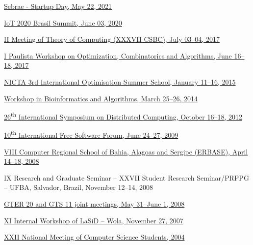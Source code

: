 \documentclass[10pt]{article}
\begin{document}
\begin{innerlist}
\item \href{https://sebrae.com.br/startupday}{Sebrae - Startup Day, May 22, 2021}
  
\item \href{https://telecomwebinar.com/iot-brasil-summit-2020/}{IoT 2020 Brasil Summit, June 03, 2020}
  
    \item \href{http://csbc2017.mackenzie.br/eventos/2-etc}{II Meeting of Theory of Computing (XXXVII CSBC), July 03--04, 2017}
  
    \item \href{https://www.ic.unicamp.br/~ra134042/wopoca2017/}{I Paulista Workshop on Optimization, Combinatorics and Algorithms, June 16--18, 2017}
  
    \item \href{http://org.nicta.com.au/study-with-us/nicta-optimisation-summer-school-2015/}{NICTA 3rd International Optimisation Summer School, January 11--16, 2015}

	\item \href{http://www.ime.usp.br/~afreire/WBA2014.html}{Workshop in Bioinformatics and Algorithms, March 25--26, 2014}

    \item \href{http://www.lasid.ufba.br/disc2012/view/index.php}{26\textsuperscript{th} International Symposium on Distributed Computing, October 16--18, 2012}

    \item \href{http://softwarelivre.org/fisl}{10\textsuperscript{th} International Free Software Forum, June 24--27, 2009}
    
    \item \href{http://www.erbase2008.ufba.br}{VIII Computer Regional School of Bahia, Alagoas and Sergipe (ERBASE), April 14--18, 2008}

    \item IX Research and Graduate Seminar -- XXVII Student Research Seminar/PRPPG -- UFBA, Salvador, Brazil, November 12--14, 2008

    \item \href{https://gts.nic.br/reunioes/gts-11}{GTER 20 and GTS 11 joint meetings, May 31--June 1, 2008}

    \item \href{http://listas.dcc.ufba.br/pipermail/estudantes-comp/2007-November/003076.html}{XI Internal Workshop of LaSiD -- Wola, November 27, 2007}

    \item \href{http://wiki.enec.org.br/ENECOMP2004}{XXII National Meeting of Computer Science Students, 2004}

\end{innerlist}
\end{document}
